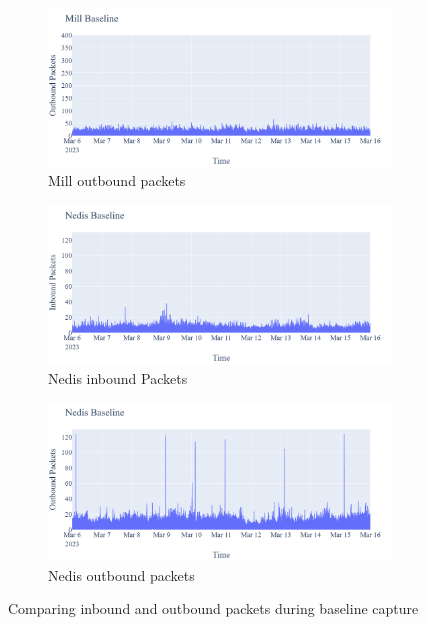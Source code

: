 \begin{figure}[H]
\begin{subfigure}[b]{0.4\textwidth}
    \end{subfigure}
    \begin{subfigure}[b]{0.4\textwidth}
        \includegraphics[width=\textwidth]{figures/Mill_Baseline_outboundPackets.png}
        \caption{Mill outbound packets}
    \end{subfigure}
    \begin{subfigure}[b]{0.4\textwidth}
        \includegraphics[width=\textwidth]{figures/Nedis_Baseline_InboundPackets.png}
        \caption{Nedis inbound Packets}
    \end{subfigure}
    \begin{subfigure}[b]{0.4\textwidth}
        \includegraphics[width=\textwidth]{figures/Nedis_Baseline_OutboundPackets.png}
        \caption{Nedis outbound packets}
    \end{subfigure}
    \caption{Comparing inbound and outbound packets during baseline capture}
    \label{Fig:CompareBaselineOutandInboundPackets}
 \end{figure}


